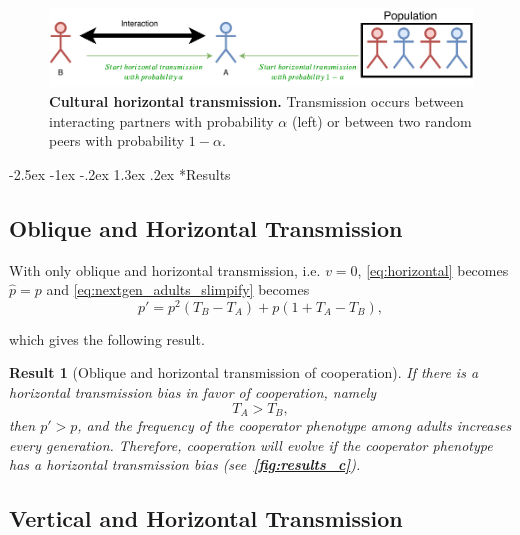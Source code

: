 \documentclass[12pt]{extarticle}
\makeatletter
\renewcommand\section{\@startsection {section}{1}{\z@}%
     {-2.5ex \@plus -1ex \@minus -.2ex}%
     {1.3ex \@plus.2ex}%
    {\Large\bfseries}}
\newtheorem{result}{Result}
\makeatother
\begin{document}
\begin{figure}[b]
  \centering
  \includegraphics[scale=1]{figure1.pdf}
  \caption{\textbf{Cultural horizontal transmission.} Transmission occurs between interacting partners with probability $\alpha$ (left) or between two random peers with probability $1-\alpha$.}
  \label{fig:horizontal}
\end{figure}


\section*{Results}


\subsection*{Oblique and Horizontal Transmission}

With only oblique and horizontal transmission, i.e. $v = 0$, \autoref{eq:horizontal} becomes $\hat{p}=p$ and \autoref{eq:nextgen_adults_slimpify} becomes %
\begin{equation}  \label{eq:nextgen_parents_oblique_only}
p' = p^2 (T_B-T_A) + p (1+T_A-T_B) ,
\end{equation}

which gives the following result.

\begin{result}[Oblique and horizontal transmission of cooperation]
If there is a horizontal transmission bias in favor of cooperation, namely
\begin{equation} \label{eq:oblique_only_result}
T_A > T_B, 
\end{equation}
then $p'>p$, and the frequency of the cooperator phenotype among adults increases every generation.
Therefore, cooperation will evolve if the cooperator phenotype has a horizontal transmission bias (see~\textbf{\autoref{fig:results_c}}).
\end{result}


\subsection*{Vertical and Horizontal Transmission}
\end{document}

